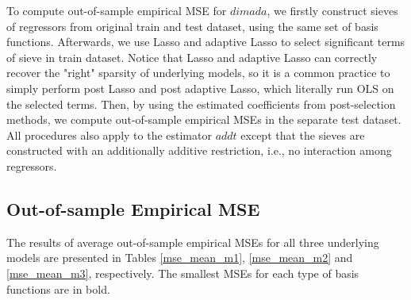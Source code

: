 \documentclass[12pt, a4paper]{article}
\theoremstyle{MAstyle} \newtheorem{assumption}{Assumption}[section]
\theoremstyle{MAstyle} \newtheorem{definition}{Definition}[section]
\theoremstyle{MAstyle} \newtheorem{theorem}{Theorem}[section]
\theoremstyle{MAstyle} \newtheorem{corollary}{Corollary}[section]
\begin{document}
                To compute out-of-sample empirical MSE for $dimada$, we firstly construct sieves of regressors from original train and test dataset, using the same set of basis functions. Afterwards, we use Lasso and adaptive Lasso to select significant terms of sieve in train dataset. Notice that Lasso and adaptive Lasso can correctly recover the "right" sparsity of underlying models, so it is a common practice to simply perform post Lasso and post adaptive Lasso, which literally run OLS on the selected terms. Then, by using the estimated coefficients from post-selection methods, we compute out-of-sample empirical MSEs in the separate test dataset. All procedures also apply to the estimator $addt$ except that the sieves are constructed with an additionally additive restriction, i.e., no interaction among regressors. 

            \subsection{Out-of-sample Empirical MSE}\label{empirical_mse}
                The results of average out-of-sample empirical MSEs for all three underlying models are presented in Tables \ref{mse_mean_m1}, \ref{mse_mean_m2} and \ref{mse_mean_m3}, respectively. The smallest MSEs for each type of basis functions are in bold. 
\end{document}
